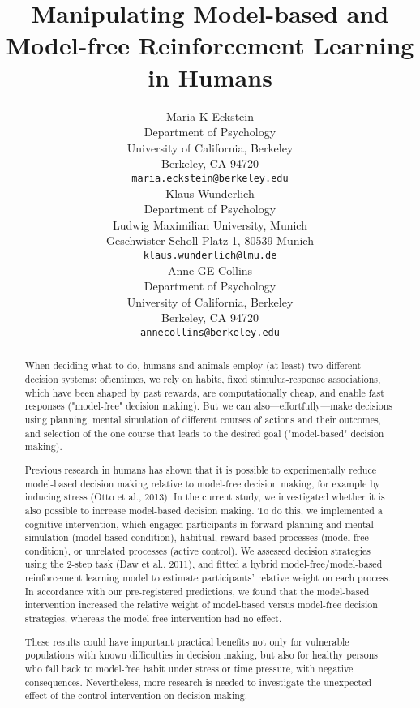 \documentclass[11pt]{article} %
\title{Manipulating Model-based and Model-free Reinforcement Learning in Humans}
\author{
Maria K Eckstein \\
Department of Psychology \\
University of California, Berkeley \\
Berkeley, CA 94720 \\
\texttt{maria.eckstein@berkeley.edu} \\
\And
Klaus Wunderlich \\
Department of Psychology \\
Ludwig Maximilian University, Munich \\
Geschwister-Scholl-Platz 1, 80539 Munich \\
\texttt{klaus.wunderlich@lmu.de} \\
\And
Anne GE Collins \\
Department of Psychology\\
University of California, Berkeley \\
Berkeley, CA 94720  \\
\texttt{annecollins@berkeley.edu} \\
}
\begin{document}
\maketitle

\begin{abstract}

When deciding what to do, humans and animals employ (at least) two different decision systems: oftentimes, we rely on habits, fixed stimulus-response associations, which have been shaped by past rewards, are computationally cheap, and enable fast responses ("model-free" decision making). But we can also---effortfully---make decisions using planning, mental simulation of different courses of actions and their outcomes, and selection of the one course that leads to the desired goal ("model-based" decision making). 

Previous research in humans has shown that it is possible to experimentally reduce model-based decision making relative to model-free decision making, for example by inducing stress (Otto et al., 2013). In the current study, we investigated whether it is also possible to increase model-based decision making. To do this, we implemented a cognitive intervention, which engaged participants in forward-planning and mental simulation (model-based condition), habitual, reward-based processes (model-free condition), or unrelated processes (active control). We assessed decision strategies using the 2-step task (Daw et al., 2011), and fitted a hybrid model-free/model-based reinforcement learning model to estimate participants' relative weight on each process. In accordance with our pre-registered predictions, we found that the model-based intervention increased the relative weight of model-based versus model-free decision strategies, whereas the model-free intervention had no effect. 

These results could have important practical benefits not only for vulnerable populations with known difficulties in decision making, but also for healthy persons who fall back to model-free habit under stress or time pressure, with negative consequences. Nevertheless, more research is needed to investigate the unexpected effect of the control intervention on decision making.

\end{abstract}


\end{document}
